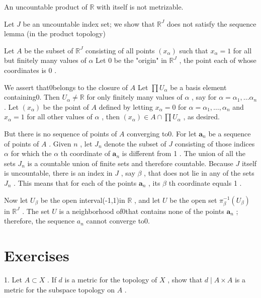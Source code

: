 \begin{example} An uncountable product of \(\mathbb{R}\) with itself is not metrizable.

Let \(J\) be an uncountable index set; we show that \({\mathbb{R}}^{J}\) does not satisfy the sequence lemma (in the product topology)

Let \(A\) be the subset of \({\mathbb{R}}^{J}\) consisting of all points \(\left( {x}_{\alpha }\right)\) such that \({x}_{\alpha } = 1\) for all but finitely many values of \(\alpha\) Let 0 be the "origin" in \({\mathbb{R}}^{J}\) , the point each of whose coordinates is 0 .

We assert that0belongs to the closure of \(A\) Let \(\prod {U}_{\alpha }\) be a basis element containing0. Then \({U}_{\alpha } \neq  \mathbb{R}\) for only finitely many values of \(\alpha\) , say for \(\alpha  = {\alpha }_{1},\ldots {\alpha }_{n}\) . Let \(\left( {x}_{\alpha }\right)\) be the point of \(A\) defined by letting \({x}_{\alpha } = 0\) for \(\alpha  = {\alpha }_{1},\ldots ,{\alpha }_{n}\) and \({x}_{\alpha } = 1\) for all other values of \(\alpha\) , then \(\left( {x}_{\alpha }\right)  \in  A \cap  \prod {U}_{\alpha }\) , as desired.

But there is no sequence of points of \(A\) converging to0. For let \({\mathbf{a}}_{n}\) be a sequence of points of \(A\) . Given \(n\) , let \({J}_{n}\) denote the subset of \(J\) consisting of those indices \(\alpha\) for which the \(\alpha\) th coordinate of \({\mathbf{a}}_{n}\) is different from 1 . The union of all the sets \({J}_{n}\) is a countable union of finite sets and therefore countable. Because \(J\) itself is uncountable, there is an index in \(J\) , say \(\beta\) , that does not lie in any of the sets \({J}_{n}\) . This means that for each of the points \({\mathbf{a}}_{n}\) , its \(\beta\) th coordinate equals 1 .

Now let \({U}_{\beta }\) be the open interval(-1,1)in \(\mathbb{R}\) , and let \(U\) be the open set \({\pi }_{\beta }^{-1}\left( {U}_{\beta }\right)\) in \({\mathbb{R}}^{J}\) . The set \(U\) is a neighborhood of0that contains none of the points \({\mathbf{a}}_{n}\) ; therefore, the sequence \({a}_{n}\) cannot converge to0.
\end{example}

\section*{Exercises}

1. Let \(A \subset  X\) . If \(d\) is a metric for the topology of \(X\) , show that \(d \mid  A \times  A\) is a metric for the subspace topology on \(A\) .

